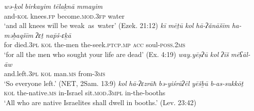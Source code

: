 \documentclass[output=paper]{langsci/langscibook}
\begin{document}
\ea%
    \label{ex:doron:19}
    \ea
    \gll \textit{wə-ḵol}     \textit{birkayim}   \textit{tēlaḵnā}                  \textit{mmayim}\\
         and-\textsc{kol}  knees.\textsc{fp}   become\textsc{.mod.3fp}   water\\
    \glt `and all knees will be weak~as~water' (Ezek. 21:12)
    \ex
    \gll \textit{kī}   \textit{mēṯū}        \textit{kol}    \textit{hā-ʔănāšīm}   \textit{ha-məḇaqšīm}         \textit{ʔɛṯ}    \textit{na\={p}š-ɛḵā}\\
         for died.\textsc{3pl}   \textsc{kol}  the-men        the-seek.\textsc{ptcp.mp}  \textsc{acc}  soul-\textsc{poss.2ms}\\
    \glt `for all the men who sought your life are dead' (Ex. 4:19)
    \z
\ex %
    \label{ex:doron:20}
    \ea
    \gll \textit{way.yēṣʔū}      \textit{kol}   \textit{ʔīš}            \textit{mēʕāl-āw}\\
         and.left\textsc{.3pl}   \textsc{kol}  man.\textsc{ms}  from-\textsc{3ms}\\
    \glt `So everyone left.' (NET, 2Sam. 13:9)
    \ex
    \gll \textit{kol}    \textit{hā-ʔɛzrāħ}         \textit{bə-yiśrāʔēl}  \textit{yēšḇū}                \textit{b-as-sukkōṯ}\\
         \textsc{kol}  the-native\textsc{.ms}  in-Israel       sit.\textsc{mod.3mpl}  in-the-booths\\
    \glt `All who are native Israelites shall dwell in booths.' (Lev. 23:42)
    \z
\z
\end{document}
